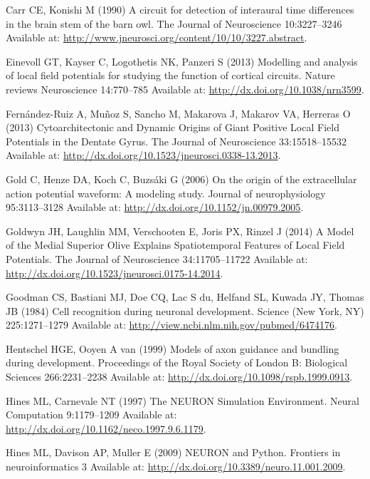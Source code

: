 \documentclass[]{article}
\begin{document}
\hypertarget{ref-carr90}{}
Carr CE, Konishi M (1990) A circuit for detection of interaural time
differences in the brain stem of the barn owl. The Journal of
Neuroscience 10:3227--3246 Available at:
\url{http://www.jneurosci.org/content/10/10/3227.abstract}.

\hypertarget{ref-Einevoll2013Modelling}{}
Einevoll GT, Kayser C, Logothetis NK, Panzeri S (2013) Modelling and
analysis of local field potentials for studying the function of cortical
circuits. Nature reviews Neuroscience 14:770--785 Available at:
\url{http://dx.doi.org/10.1038/nrn3599}.

\hypertarget{ref-FernandezRuiz2013Cytoarchitectonic}{}
Fernández-Ruiz A, Muñoz S, Sancho M, Makarova J, Makarov VA, Herreras O
(2013) Cytoarchitectonic and Dynamic Origins of Giant Positive Local
Field Potentials in the Dentate Gyrus. The Journal of Neuroscience
33:15518--15532 Available at:
\url{http://dx.doi.org/10.1523/jneurosci.0338-13.2013}.

\hypertarget{ref-Gold2006Origin}{}
Gold C, Henze DA, Koch C, Buzsáki G (2006) On the origin of the
extracellular action potential waveform: A modeling study. Journal of
neurophysiology 95:3113--3128 Available at:
\url{http://dx.doi.org/10.1152/jn.00979.2005}.

\hypertarget{ref-Goldwyn2014Model}{}
Goldwyn JH, Laughlin MM, Verschooten E, Joris PX, Rinzel J (2014) A
Model of the Medial Superior Olive Explains Spatiotemporal Features of
Local Field Potentials. The Journal of Neuroscience 34:11705--11722
Available at: \url{http://dx.doi.org/10.1523/jneurosci.0175-14.2014}.

\hypertarget{ref-Goodman1984Cell}{}
Goodman CS, Bastiani MJ, Doe CQ, Lac S du, Helfand SL, Kuwada JY, Thomas
JB (1984) Cell recognition during neuronal development. Science (New
York, NY) 225:1271--1279 Available at:
\url{http://view.ncbi.nlm.nih.gov/pubmed/6474176}.

\hypertarget{ref-Hentschel1999Models}{}
Hentschel HGE, Ooyen A van (1999) Models of axon guidance and bundling
during development. Proceedings of the Royal Society of London B:
Biological Sciences 266:2231--2238 Available at:
\url{http://dx.doi.org/10.1098/rspb.1999.0913}.

\hypertarget{ref-Hines1997NEURON}{}
Hines ML, Carnevale NT (1997) The NEURON Simulation Environment. Neural
Computation 9:1179--1209 Available at:
\url{http://dx.doi.org/10.1162/neco.1997.9.6.1179}.

\hypertarget{ref-Hines2009NEURON}{}
Hines ML, Davison AP, Muller E (2009) NEURON and Python. Frontiers in
neuroinformatics 3 Available at:
\url{http://dx.doi.org/10.3389/neuro.11.001.2009}.
\end{document}
